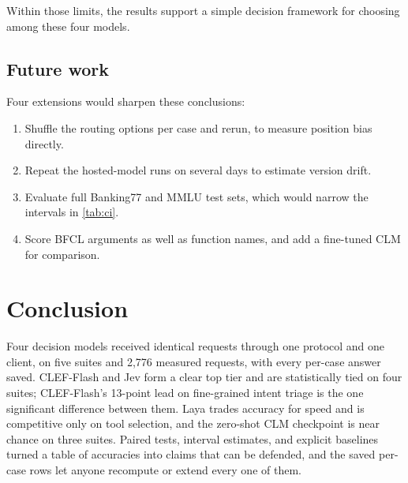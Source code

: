 \documentclass[11pt,a4paper]{article}
\begin{document}
Within those limits, the results support a simple decision framework for choosing among these four
models.

\begin{decision}
\end{decision}

\subsection{Future work}\label{sec:future}

Four extensions would sharpen these conclusions:
\begin{enumerate}
  \item Shuffle the routing options per case and rerun, to measure position bias directly.
  \item Repeat the hosted-model runs on several days to estimate version drift.
  \item Evaluate full Banking77 and MMLU test sets, which would narrow the intervals in \cref{tab:ci}.
  \item Score BFCL arguments as well as function names, and add a fine-tuned CLM for comparison.
\end{enumerate}

\section{Conclusion}\label{sec:conclusion}

Four decision models received identical requests through one protocol and one client, on five suites
and 2,776 measured requests, with every per-case answer saved. CLEF-Flash and Jev form a clear top tier
and are statistically tied on four suites; CLEF-Flash's 13-point lead on fine-grained intent triage is
the one significant difference between them. Laya trades accuracy for speed and is competitive only on
tool selection, and the zero-shot CLM checkpoint is near chance on three suites. Paired tests, interval
estimates, and explicit baselines turned a table of accuracies into claims that can be defended, and the
saved per-case rows let anyone recompute or extend every one of them.
\end{document}
